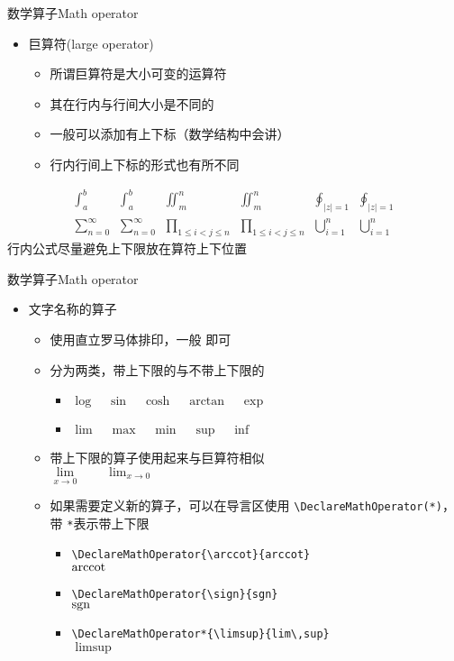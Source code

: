 \begin{frame}[fragile]{数学算子}{Math operator}
	\begin{itemize}
		\item 巨算符(large operator)
		\begin{itemize}
			\item 所谓巨算符是大小可变的运算符
			\item 其在行内与行间大小是不同的
			\item 一般可以添加有上下标（数学结构中会讲）
			\item 行内行间上下标的形式也有所不同
		\end{itemize}
	\end{itemize}
	\begin{align*}
		\int_a^b & \textstyle \int_a^b & \iint_m^n & \textstyle \iint_m^n & \oint_{|z|=1} & \textstyle \oint_{|z|=1} \\
		\sum_{n=0}^{\infty} & \textstyle \sum_{n=0}^{\infty} & \prod_{1 \le i < j \le n} & \textstyle \prod_{1 \le i < j \le n} & \bigcup\nolimits_{i=1}^{n} & \textstyle \bigcup\limits_{i=1}^{n}
	\end{align*}
	\small \quad \cprotect\fbox{\verb|\limits|} \quad \cprotect\fbox{\verb|\nolimits|} \quad 行内公式尽量避免上下限放在算符上下位置
\end{frame}
\begin{frame}[fragile]{数学算子}{Math operator}
	\begin{itemize}
		\item 文字名称的算子
		\begin{itemize}
			\item 使用直立罗马体排印，一般 \cprotect{} 即可
			\item 分为两类，带上下限的与不带上下限的
			\begin{itemize}
				\item $\log \quad \sin \quad \cosh \quad \arctan \quad \exp$ 
				\item $\lim \quad \max \quad \min \quad \sup \quad \inf$ 
			\end{itemize}
			\item 带上下限的算子使用起来与巨算符相似\\
				\qquad $\lim\limits_{x \to 0} \qquad \lim_{x \to 0}$
			\item 如果需要定义新的算子，可以在导言区使用 \verb|\DeclareMathOperator(*)|，带 \verb|*|表示带上下限
			\begin{itemize}
				\item \verb|\DeclareMathOperator{\arccot}{arccot}| \\ $\arccot$
				\item \verb|\DeclareMathOperator{\sign}{sgn}| \\ $\sign$
				\item \verb|\DeclareMathOperator*{\limsup}{lim\,sup}| \\ $\limsup$
			\end{itemize}
		\end{itemize}
	\end{itemize}
\end{frame}
